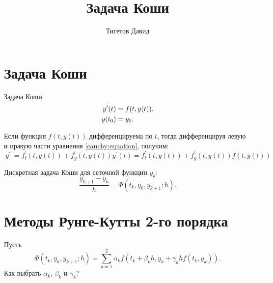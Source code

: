 \documentclass[a4paper,12pt]{article}
\begin{document}
\title{Задача Коши}
\author{Тигетов Давид}
\maketitle

\section{Задача Коши}

Задача Коши
\begin{align}
    y^\prime(t) & = f(t, y(t)) ,
    \label{cauchy:equation}      \\
    y(t_0)      & = y_0 .
    \notag
\end{align}

Если функция $f(t,y(t))$ дифференцируема по $t$, тогда дифференцируя левую и правую части уравнения \eqref{cauchy:equation}, получим:
\begin{equation}~\label{cauchy:section_derivative}
    y^{\prime\prime}
    = f_t^\prime(t,y(t)) + f_y^\prime(t,y(t)) y^\prime(t)
    = f_t^\prime(t,y(t)) + f_y^\prime(t,y(t)) f(t,y(t))
\end{equation}

Дискретная задача Коши для сеточной функции $y_k$:
\[
    \frac{y_{k+1} - y_k}{h} = \Phi(t_k, y_k, y_{k+1}; h).
\]

\section{Методы Рунге-Кутты 2-го порядка}

Пусть
\[
    \Phi(t_k, y_k, y_{k+1}; h) = \sum_{k=1}^2 \alpha_k f(t_k + \beta_k h, y_k + \gamma_k h f(t_k,y_k)).
\]
Как выбрать $\alpha_k$, $\beta_k$ и $\gamma_k$?
\end{document}
